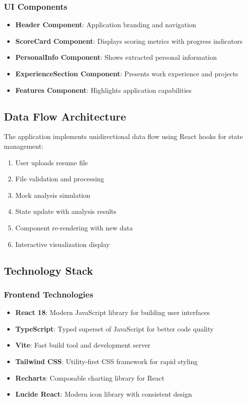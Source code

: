 \documentclass[12pt,a4paper]{article}
\begin{document}
\subsubsection{UI Components}
\begin{itemize}
    \item \textbf{Header Component}: Application branding and navigation
    \item \textbf{ScoreCard Component}: Displays scoring metrics with progress indicators
    \item \textbf{PersonalInfo Component}: Shows extracted personal information
    \item \textbf{ExperienceSection Component}: Presents work experience and projects
    \item \textbf{Features Component}: Highlights application capabilities
\end{itemize}

\subsection{Data Flow Architecture}
The application implements unidirectional data flow using React hooks for state management:

\begin{enumerate}
    \item User uploads resume file
    \item File validation and processing
    \item Mock analysis simulation
    \item State update with analysis results
    \item Component re-rendering with new data
    \item Interactive visualization display
\end{enumerate}

\subsection{Technology Stack}
\subsubsection{Frontend Technologies}
\begin{itemize}
    \item \textbf{React 18}: Modern JavaScript library for building user interfaces
    \item \textbf{TypeScript}: Typed superset of JavaScript for better code quality
    \item \textbf{Vite}: Fast build tool and development server
    \item \textbf{Tailwind CSS}: Utility-first CSS framework for rapid styling
    \item \textbf{Recharts}: Composable charting library for React
    \item \textbf{Lucide React}: Modern icon library with consistent design
\end{itemize}
\end{document}
